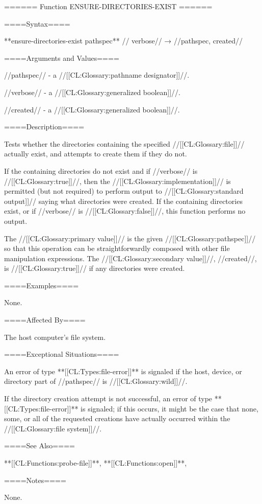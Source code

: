 ====== Function ENSURE-DIRECTORIES-EXIST ======

====Syntax====

**ensure-directories-exist {pathspec** //\key} verbose// → //pathspec, created//

====Arguments and Values====

//pathspec// - a //[[CL:Glossary:pathname designator]]//.

//verbose// - a //[[CL:Glossary:generalized boolean]]//.

//created// - a //[[CL:Glossary:generalized boolean]]//.

====Description====

Tests whether the directories containing the specified //[[CL:Glossary:file]]// actually exist, and attempts to create them if they do not.

If the containing directories do not exist and if //verbose// is //[[CL:Glossary:true]]//, then the //[[CL:Glossary:implementation]]// is permitted (but not required) to perform output to //[[CL:Glossary:standard output]]// saying what directories were created. If the containing directories exist, or if //verbose// is //[[CL:Glossary:false]]//, this function performs no output.

The //[[CL:Glossary:primary value]]// is the given //[[CL:Glossary:pathspec]]// so that this operation can be straightforwardly composed with other file manipulation expressions. The //[[CL:Glossary:secondary value]]//, //created//, is //[[CL:Glossary:true]]// if any directories were created.

====Examples====

None.

====Affected By====

The host computer's file system.

====Exceptional Situations====

An error of type **[[CL:Types:file-error]]** is signaled if the host, device, or directory part of //pathspec// is //[[CL:Glossary:wild]]//.

If the directory creation attempt is not successful, an error of type **[[CL:Types:file-error]]** is signaled; if this occurs, it might be the case that none, some, or all of the requested creations have actually occurred within the //[[CL:Glossary:file system]]//.

====See Also====

**[[CL:Functions:probe-file]]**, **[[CL:Functions:open]]**,

{\secref\PathnamesAsFilenames}

====Notes====

None.

  
